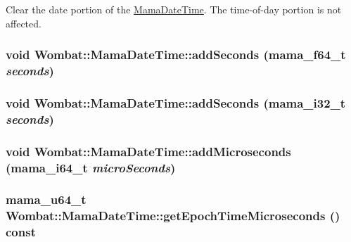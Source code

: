 Clear the date portion of the \hyperlink{classWombat_1_1MamaDateTime}{MamaDateTime}. The time-\/of-\/day portion is not affected. \hypertarget{classWombat_1_1MamaDateTime_a914be94d3770fa57b01e543b07f4896b}{
\subsubsection[{addSeconds}]{\setlength{\rightskip}{0pt plus 5cm}void Wombat::MamaDateTime::addSeconds (mama\_\-f64\_\-t {\em seconds})}}
\label{classWombat_1_1MamaDateTime_a914be94d3770fa57b01e543b07f4896b}
\hypertarget{classWombat_1_1MamaDateTime_a903f9fab62263e0e349e5ceb93229385}{
\subsubsection[{addSeconds}]{\setlength{\rightskip}{0pt plus 5cm}void Wombat::MamaDateTime::addSeconds (mama\_\-i32\_\-t {\em seconds})}}
\label{classWombat_1_1MamaDateTime_a903f9fab62263e0e349e5ceb93229385}
\hypertarget{classWombat_1_1MamaDateTime_a3dee4c25584a8a79a5493e8f62fc2cf6}{
\subsubsection[{addMicroseconds}]{\setlength{\rightskip}{0pt plus 5cm}void Wombat::MamaDateTime::addMicroseconds (mama\_\-i64\_\-t {\em microSeconds})}}
\label{classWombat_1_1MamaDateTime_a3dee4c25584a8a79a5493e8f62fc2cf6}
\hypertarget{classWombat_1_1MamaDateTime_ab9814ea39a88a354c0c99b31f920a14c}{
\subsubsection[{getEpochTimeMicroseconds}]{\setlength{\rightskip}{0pt plus 5cm}mama\_\-u64\_\-t Wombat::MamaDateTime::getEpochTimeMicroseconds () const}}
\label{classWombat_1_1MamaDateTime_ab9814ea39a88a354c0c99b31f920a14c}


